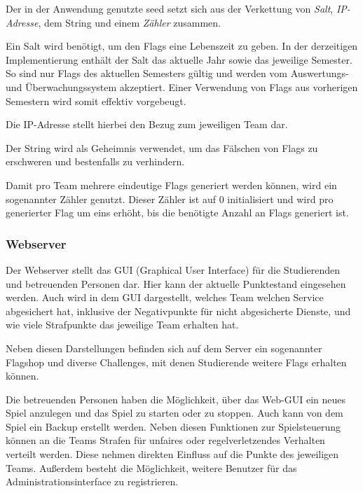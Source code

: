 Der in der Anwendung genutzte seed setzt sich aus der Verkettung von \textit{Salt}, \textit{IP-Adresse}, dem String  und einem \textit{Zähler} zusammen.

Ein Salt wird benötigt, um den Flags eine Lebenszeit zu geben. In der derzeitigen Implementierung enthält der Salt das aktuelle Jahr sowie das jeweilige Semester. So sind nur Flags des aktuellen Semesters gültig und werden vom Auswertungs- und Überwachungssystem akzeptiert. Einer Verwendung von Flags aus vorherigen Semestern wird somit effektiv vorgebeugt.

Die IP-Adresse stellt hierbei den Bezug zum jeweiligen Team dar.

Der String  wird als Geheimnis verwendet, um das Fälschen von Flags zu erschweren und bestenfalls zu verhindern.

Damit pro Team mehrere eindeutige Flags generiert werden können, wird ein sogenannter Zähler genutzt. Dieser Zähler ist auf 0 initialisiert und wird pro generierter Flag um eins erhöht, bis die benötigte Anzahl an Flags generiert ist. \cite[S.48]{sosnaKonzeptionUndRealisierung2010}

\subsubsection{Webserver}\label{subsubsec:Webserver}

Der Webserver stellt das GUI (Graphical User Interface) für die Studierenden und betreuenden Personen dar. Hier kann der aktuelle Punktestand eingesehen werden. Auch wird in dem GUI dargestellt, welches Team welchen Service abgesichert hat, inklusive der Negativpunkte für nicht abgesicherte Dienste, und wie viele Strafpunkte das jeweilige Team erhalten hat.

Neben diesen Darstellungen befinden sich auf dem Server ein sogenannter Flagshop und diverse Challenges, mit denen Studierende weitere Flags erhalten können.

Die betreuenden Personen haben die Möglichkeit, über das Web-GUI ein neues Spiel anzulegen und das Spiel zu starten oder zu stoppen. Auch kann von dem Spiel ein Backup erstellt werden. Neben diesen Funktionen zur Spielsteuerung können an die Teams Strafen für unfaires oder regelverletzendes Verhalten verteilt werden. Diese nehmen direkten Einfluss auf die Punkte des jeweiligen Teams. Außerdem besteht die Möglichkeit, weitere Benutzer für das Administrationsinterface zu registrieren.

